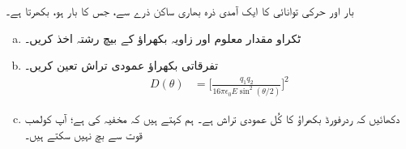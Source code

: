  بار  اور حرکی توانائی  کا ایک آمدی ذرہ بھاری ساکن ذرے سے، جس کا بار  ہو، بکھرتا ہے۔
\begin{enumerate}[a.]
\item
ٹکراو مقدار معلوم اور زاویہ بکھراؤ کے بیچ رشتہ اخذ کریں۔

 
\item
 تفرقاتی بکھراؤ عمودی تراش تعین کریں۔ 
\begin{align}\label{مساوات_بکھراو_تفریقی_بکھراو_عمودی_تراش}
D(\theta)&=\big[\frac{q_1q_2}{16\pi\epsilon_0E\sin^2(\theta/2)}\big]^2
\end{align}
\item
 دکھائیں کہ ردرفورڈ بکھراؤ کا کُل عمودی تراش  ہے۔ ہم کہتے ہیں کہ  مخفیہ کی  ہے؛ آپ کولمب قوت سے بچ نہیں سکتے ہیں۔
 \end{enumerate}


